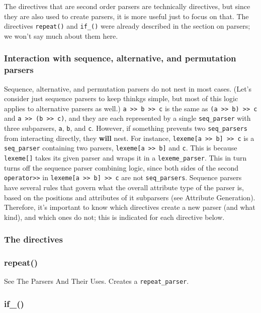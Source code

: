 The directives that are second order parsers are technically directives, but since they are also used to create parsers, it is more useful just to focus on that. The directives \texttt{repeat()} and \texttt{if\_()} were already described in the section on parsers; we won't say much about them here.

\subsubsection{Interaction with sequence, alternative, and permutation parsers}

Sequence, alternative, and permutation parsers do not nest in most cases. (Let's consider just sequence parsers to keep thinkgs simple, but most of this logic applies to alternative parsers as well.) \texttt{a >> b >> c} is the same as \texttt{(a >> b) >> c} and \texttt{a >> (b >> c)}, and they are each represented by a single \texttt{seq\_parser} with three subparsers, \texttt{a}, \texttt{b}, and \texttt{c}. However, if something prevents two \texttt{seq\_parsers} from interacting directly, they \textbf{will} nest. For instance, \texttt{lexeme{[}a >> b{]} >> c} is a \texttt{seq\_parser} containing two parsers, \texttt{lexeme{[}a >> b{]}} and \texttt{c}. This is because \texttt{lexeme{[}{]}} takes its given parser and wraps it in a \texttt{lexeme\_parser}. This in turn turns off the sequence parser combining logic, since both sides of the second \texttt{operator>>} in \texttt{lexeme{[}a >> b{]} >> c} are not \texttt{seq\_parsers}. Sequence parsers have several rules that govern what the overall attribute type of the parser is, based on the positions and attributes of it subparsers (see Attribute Generation). Therefore, it's important to know which directives create a new parser (and what kind), and which ones do not; this is indicated for each directive below.

\subsubsection{The directives}

\subsubsection{repeat()}

See The Parsers And Their Uses. Creates a \texttt{repeat\_parser}.

\subsubsection{if\_()}


